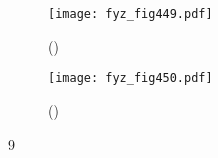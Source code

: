     \begin{figure}[ht!] %
      \centering
      \texttt{[image: fyz\_fig449.pdf]}
      \caption{ 
               (\cite[s.~707]{Feynman01})}
      \label{fyz:fig449}
    \end{figure}

    \begin{figure}[ht!] %
      \centering
      \texttt{[image: fyz\_fig450.pdf]}
      \caption{ 
               (\cite[s.~707]{Feynman01})}
      \label{fyz:fig450}
    \end{figure}
    9 
